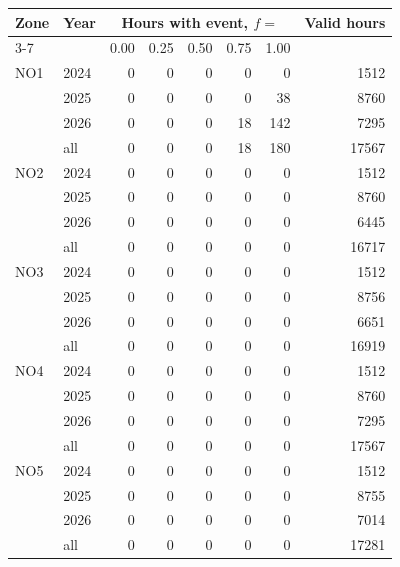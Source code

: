 \begin{tabular}{llrrrrrr}
\toprule
Zone & Year & \multicolumn{5}{c}{Hours with event, $f =$} & Valid hours \\
\cmidrule(lr){3-7}
 & & 0.00 & 0.25 & 0.50 & 0.75 & 1.00 & \\
\midrule
NO1 & 2024 & 0 & 0 & 0 & 0 & 0 & 1512 \\
 & 2025 & 0 & 0 & 0 & 0 & 38 & 8760 \\
 & 2026 & 0 & 0 & 0 & 18 & 142 & 7295 \\
 & all & 0 & 0 & 0 & 18 & 180 & 17567 \\
\addlinespace
NO2 & 2024 & 0 & 0 & 0 & 0 & 0 & 1512 \\
 & 2025 & 0 & 0 & 0 & 0 & 0 & 8760 \\
 & 2026 & 0 & 0 & 0 & 0 & 0 & 6445 \\
 & all & 0 & 0 & 0 & 0 & 0 & 16717 \\
\addlinespace
NO3 & 2024 & 0 & 0 & 0 & 0 & 0 & 1512 \\
 & 2025 & 0 & 0 & 0 & 0 & 0 & 8756 \\
 & 2026 & 0 & 0 & 0 & 0 & 0 & 6651 \\
 & all & 0 & 0 & 0 & 0 & 0 & 16919 \\
\addlinespace
NO4 & 2024 & 0 & 0 & 0 & 0 & 0 & 1512 \\
 & 2025 & 0 & 0 & 0 & 0 & 0 & 8760 \\
 & 2026 & 0 & 0 & 0 & 0 & 0 & 7295 \\
 & all & 0 & 0 & 0 & 0 & 0 & 17567 \\
\addlinespace
NO5 & 2024 & 0 & 0 & 0 & 0 & 0 & 1512 \\
 & 2025 & 0 & 0 & 0 & 0 & 0 & 8755 \\
 & 2026 & 0 & 0 & 0 & 0 & 0 & 7014 \\
 & all & 0 & 0 & 0 & 0 & 0 & 17281 \\
\bottomrule
\end{tabular}
